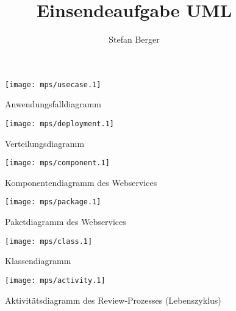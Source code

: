 \documentclass{article}
\begin{document}
\title{\Large Einsendeaufgabe UML}
\author{\normalsize Stefan Berger}
\date{}
\maketitle

\vspace{160px}

\listoffigures

\pagebreak

\hspace{0pt}
\vfill

\begin{figure}[h]
\centering
\texttt{[image: mps/usecase.1]}
\caption{Anwendungsfalldiagramm}
\end{figure}

\vspace{80px}

\begin{figure}[h]
\centering
\texttt{[image: mps/deployment.1]}
\caption{Verteilungsdiagramm}
\end{figure}

\hspace{0pt}
\vfill

\pagebreak

\hspace{0pt}
\vfill
\begin{figure}[h]
\centering
\texttt{[image: mps/component.1]}
\caption{Komponentendiagramm des Webservices}
\end{figure}

\vspace{80px}

\begin{figure}[h]
\centering
\texttt{[image: mps/package.1]}
\caption{Paketdiagramm des Webservices}
\end{figure}

\hspace{0pt}
\vfill

\pagebreak

\begin{landscape}
\begin{figure}[h]
\centering
\texttt{[image: mps/class.1]}
\caption{Klassendiagramm}
\end{figure}
\end{landscape}

\pagebreak

\begin{landscape}
\hspace{0pt}
\vfill
\begin{figure}[h]
\centering
\texttt{[image: mps/activity.1]}
\caption{Aktivitätsdiagramm des Review-Prozesses (Lebenszyklus)}
\end{figure}
\hspace{0pt}
\vfill
\end{landscape}
\end{document}

